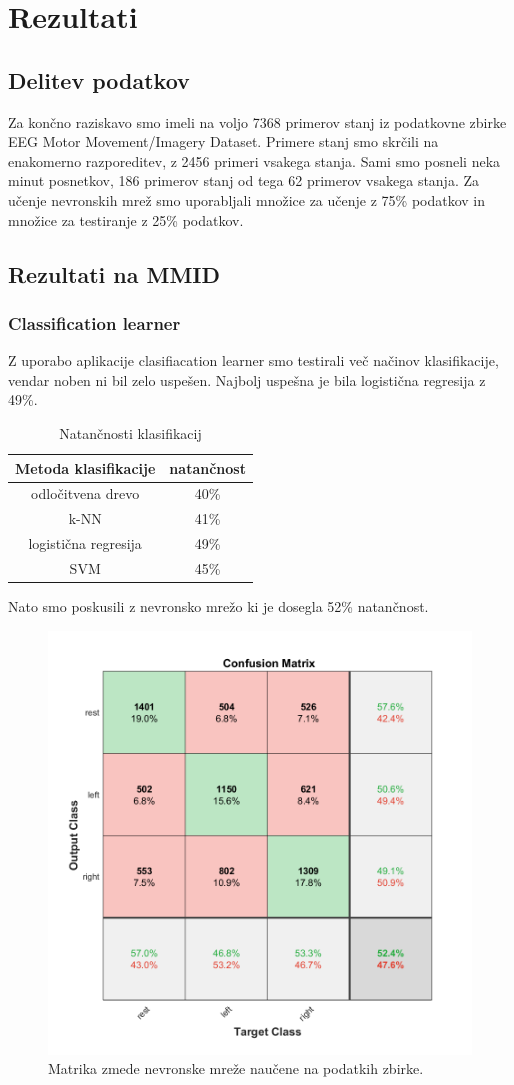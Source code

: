 \chapter{Rezultati}
\section{Delitev podatkov}
Za končno raziskavo smo imeli na voljo 7368 primerov stanj iz podatkovne zbirke EEG Motor Movement/Imagery Dataset. Primere stanj smo skrčili na enakomerno razporeditev, z 2456 primeri vsakega stanja. Sami smo posneli neka minut posnetkov, 186 primerov stanj od tega 62 primerov vsakega stanja. Za učenje nevronskih mrež smo uporabljali množice za učenje z 75\% podatkov in množice za testiranje z 25\% podatkov.



\section{Rezultati na MMID}
\subsection{Classification learner}
Z uporabo aplikacije clasifiacation learner smo testirali več načinov klasifikacije, vendar noben ni bil zelo uspešen. Najbolj uspešna je bila logistična regresija z 49\%.
\begin{table}[h]
\centering
\begin{tabular}{|c|c|}
\hline
Metoda klasifikacije & natančnost \\
\hline
odločitvena drevo & 40\%  \\
\hline
k-NN & 41\% \\
\hline
logistična regresija & 49\% \\
\hline
SVM & 45\% \\
\hline
\end{tabular}
\caption{Natančnosti klasifikacij}
\end{table}

Nato smo poskusili z nevronsko mrežo ki je dosegla 52\% natančnost.

\begin{figure}[h!]
\begin{center}
\includegraphics[width=0.5\linewidth]{slike/Confusion_13-20Hz_0s-4s.png}
\end{center}
\caption{Matrika zmede nevronske mreže naučene na podatkih zbirke.}
\end{figure}



